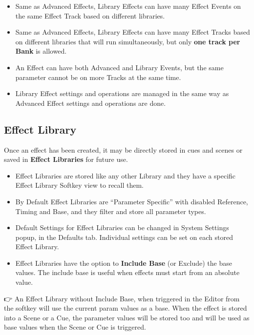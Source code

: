 \documentclass[
]{article}
\providecommand{\tightlist}{%
  \setlength{\itemsep}{0pt}\setlength{\parskip}{0pt}}
\begin{document}
\begin{itemize}
\item
  Same as Advanced Effects, Library Effects can have many Effect Events on the same Effect Track based on different libraries.
\item
  Same as Advanced Effects, Library Effects can have many Effect Tracks based on different libraries that will run simultaneously, but only \textbf{one track per Bank} is allowed.
\item
  An Effect can have both Advanced and Library Events, but the same parameter cannot be on more Tracks at the same time.
\item
  Library Effect settings and operations are managed in the same way as Advanced Effect settings and operations are done.
\end{itemize}

\hypertarget{Effect-Library-9.7}{%
\subsection{Effect Library}\label{Effect-Library-9.7}}

Once an effect has been created, it may be directly stored in cues and scenes or saved in \textbf{Effect Libraries} for future use.

\begin{itemize}
\item
  Effect Libraries are stored like any other Library and they have a specific Effect Library Softkey view to recall them.
\item
  By Default Effect Libraries are ``Parameter Specific'' with disabled Reference, Timing and Base, and they filter and store all parameter types.
\item
  Default Settings for Effect Libraries can be changed in System Settings popup, in the Defaults tab. Individual settings can be set on each stored Effect Library.
\end{itemize}

\begin{itemize}
\tightlist
\item
  Effect Libraries have the option to \textbf{Include Base} (or Exclude) the base values. The include base is useful when effects must start from an absolute value.
\end{itemize}

👉 An Effect Library without Include Base, when triggered in the Editor from the softkey will use the current param values as a base. When the effect is stored into a Scene or a Cue, the parameter values will be stored too and will be used as base values when the Scene or Cue is triggered.
\end{document}
